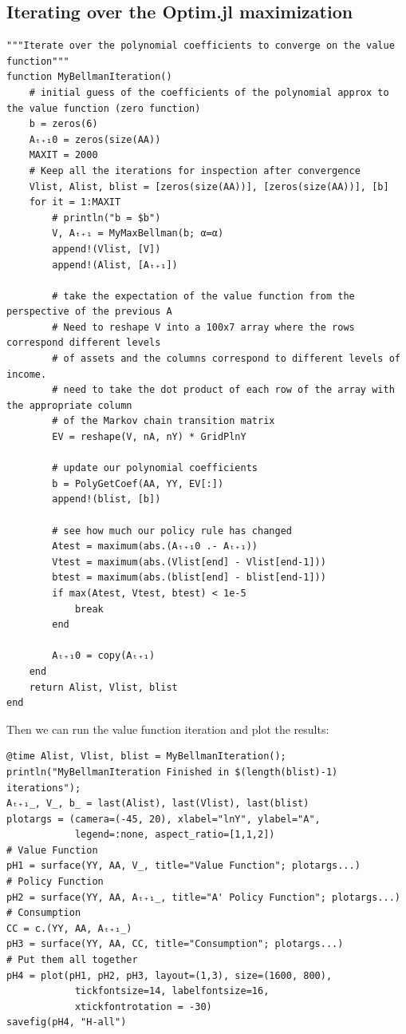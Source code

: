 \documentclass[12pt]{article}
\begin{document}
\subsection*{Iterating over the Optim.jl maximization}
\begin{lstlisting}[language=JuliaLocal, style=julia]
"""Iterate over the polynomial coefficients to converge on the value function"""
function MyBellmanIteration()
    # initial guess of the coefficients of the polynomial approx to the value function (zero function)
    b = zeros(6)
    Aₜ₊₁0 = zeros(size(AA))
    MAXIT = 2000
    # Keep all the iterations for inspection after convergence
    Vlist, Alist, blist = [zeros(size(AA))], [zeros(size(AA))], [b]
    for it = 1:MAXIT
        # println("b = $b")
        V, Aₜ₊₁ = MyMaxBellman(b; α=α)
        append!(Vlist, [V])
        append!(Alist, [Aₜ₊₁])

        # take the expectation of the value function from the perspective of the previous A
        # Need to reshape V into a 100x7 array where the rows correspond different levels
        # of assets and the columns correspond to different levels of income.
        # need to take the dot product of each row of the array with the appropriate column 
        # of the Markov chain transition matrix
        EV = reshape(V, nA, nY) * GridPlnY

        # update our polynomial coefficients
        b = PolyGetCoef(AA, YY, EV[:])
        append!(blist, [b])

        # see how much our policy rule has changed
        Atest = maximum(abs.(Aₜ₊₁0 .- Aₜ₊₁))
        Vtest = maximum(abs.(Vlist[end] - Vlist[end-1]))
        btest = maximum(abs.(blist[end] - blist[end-1]))
        if max(Atest, Vtest, btest) < 1e-5
            break
        end
        
        Aₜ₊₁0 = copy(Aₜ₊₁)
    end
    return Alist, Vlist, blist
end
\end{lstlisting}

Then we can run the value function iteration and plot the results:
\begin{lstlisting}[language=JuliaLocal, style=julia]
@time Alist, Vlist, blist = MyBellmanIteration();
println("MyBellmanIteration Finished in $(length(blist)-1) iterations");
Aₜ₊₁_, V_, b_ = last(Alist), last(Vlist), last(blist)
plotargs = (camera=(-45, 20), xlabel="lnY", ylabel="A",
            legend=:none, aspect_ratio=[1,1,2])
# Value Function
pH1 = surface(YY, AA, V_, title="Value Function"; plotargs...)
# Policy Function
pH2 = surface(YY, AA, Aₜ₊₁_, title="A' Policy Function"; plotargs...)
# Consumption
CC = c.(YY, AA, Aₜ₊₁_)
pH3 = surface(YY, AA, CC, title="Consumption"; plotargs...)
# Put them all together
pH4 = plot(pH1, pH2, pH3, layout=(1,3), size=(1600, 800),
            tickfontsize=14, labelfontsize=16,
            xtickfontrotation = -30)
savefig(pH4, "H-all")
\end{lstlisting}
\end{document}
